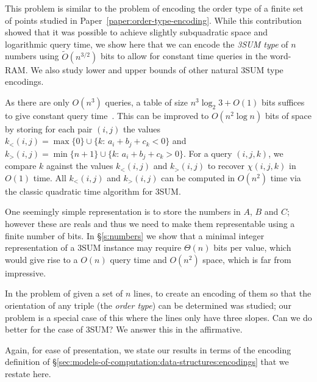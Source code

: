 This problem is similar to the problem of encoding the order
type of a finite set of points studied in Paper~\ref{paper:order-type-encoding}.
While this contribution showed that it was
possible to achieve slightly subquadratic space and logarithmic query time, we
show here that we can encode the \emph{3SUM type} of \(n\) numbers using
\(\tilde{O}(n^{3/2})\) bits to allow for constant time queries in the
word-RAM.
%
We also study lower and upper bounds of other natural 3SUM type encodings.

As there are only $O(n^3)$ queries, a table
of size $n^3 \log_2 3 + O(1)$ bits suffices to give constant query time~\cite{DPT10}.
%
This can be improved to $O(n^2\log n)$ bits of space by
storing for each pair $(i,j)$ the values
\(k_<(i,j) = \max \{ 0\}\cup \{k \colon\, a_i + b_j + c_k < 0\}\) and
\(k_>(i,j) = \min \{ n+1\}\cup \{k \colon\, a_i + b_j + c_k > 0\}\).
For a query \((i,j,k)\), we compare \(k\) against the values \(k_<(i,j)\) and \(k_>(i,j)\)
to recover \(\chi(i,j,k)\) in \(O(1)\) time. All \(k_<(i,j)\) and \(k_>(i,j)\)
can be computed in \(O(n^2)\) time via the classic quadratic time algorithm for
3SUM.

One seemingly simple representation is to store the numbers in $A$, $B$ and
$C$; however these are reals and thus we need to make them representable using
a finite number of bits.
In \S\ref{s:numbers} we show that a minimal integer representation of a
3SUM instance may require $\Theta(n)$ bits per value, which would give
rise to a $O(n)$ query time and $O(n^2)$ space, which is far from
impressive.
%


In \cite{CCILO18} the problem of given a set of $n$ lines, to create an
encoding of them so that the orientation of any triple (the \emph{order type})
can be determined was studied; our problem is a special case of this where the
lines only have three slopes.
Can we do better for the case of 3SUM? We answer this in the affirmative.

Again, for ease of presentation, we state our results in terms of the encoding
definition of \S\ref{sec:models-of-computation:data-structures:encodings} that
we restate here.
%
\DefinitionEncoding*

